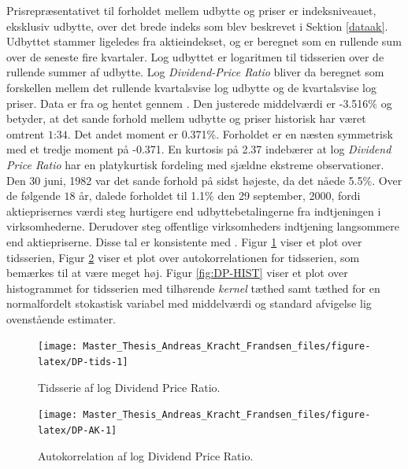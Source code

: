 \documentclass[
  a4paper,
  oneside]{memoir}
\begin{document}
Prisrepræsentativet til forholdet mellem udbytte og priser er indeksniveauet, eksklusiv udbytte, over det brede indeks som blev beskrevet i Sektion \ref{dataak}. Udbyttet stammer ligeledes fra aktieindekset, og er beregnet som en rullende sum over de seneste fire kvartaler. Log udbyttet er logaritmen til tidsserien over de rullende summer af udbytte. Log \emph{Dividend-Price Ratio} bliver da beregnet som forskellen mellem det rullende kvartalsvise log udbytte og de kvartalsvise log priser. Data er fra \citep{CRSPakt} og hentet gennem \citep{WRDSakt}. Den justerede middelværdi er -3.516\(\%\) og betyder, at det sande forhold mellem udbytte og priser historisk har været omtrent \(1\):\(34\). Det andet moment er 0.371\(\%\). Forholdet er en næsten symmetrisk med et tredje moment på -0.371. En kurtosis på 2.37 indebærer at log \emph{Dividend Price Ratio} har en platykurtisk fordeling med sjældne ekstreme observationer. Den 30 juni, 1982 var det sande forhold på sidst højeste, da det nåede 5.5\(\%\). Over de følgende \(18\) år, dalede forholdet til 1.1\(\%\) den 29 september, 2000, fordi aktieprisernes værdi steg hurtigere end udbyttebetalingerne fra indtjeningen i virksomhederne. Derudover steg offentlige virksomheders indtjening langsommere end aktiepriserne. Disse tal er konsistente med \citep{CampVic2003}. Figur \ref{fig:DP-tids} viser et plot over tidsserien, Figur \ref{fig:DP-AK} viser et plot over autokorrelationen for tidsserien, som bemærkes til at være meget høj. Figur \ref{fig:DP-HIST} viser et plot over histogrammet for tidsserien med tilhørende \emph{kernel} tæthed samt tæthed for en normalfordelt stokastisk variabel med middelværdi og standard afvigelse lig ovenstående estimater.

\begin{figure}[H]

{\centering \texttt{[image: Master\_Thesis\_Andreas\_Kracht\_Frandsen\_files/figure-latex/DP-tids-1]} 

}

\caption{Tidsserie af log Dividend Price Ratio.}\label{fig:DP-tids}
\end{figure}

\begin{figure}[H]

{\centering \texttt{[image: Master\_Thesis\_Andreas\_Kracht\_Frandsen\_files/figure-latex/DP-AK-1]} 

}

\caption{Autokorrelation af log Dividend Price Ratio.}\label{fig:DP-AK}
\end{figure}
\end{document}
